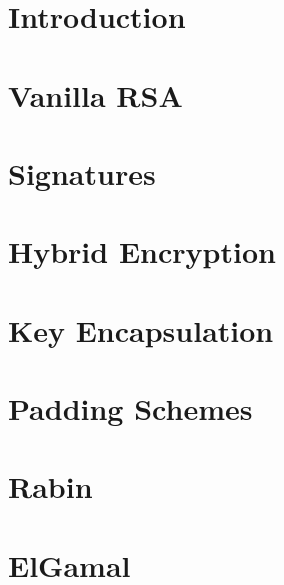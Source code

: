 
\section{Introduction}

\section{Vanilla RSA}

\section{Signatures}

\section{Hybrid Encryption}

\section{Key Encapsulation}

\section{Padding Schemes}

\section{Rabin}

\section{ElGamal}